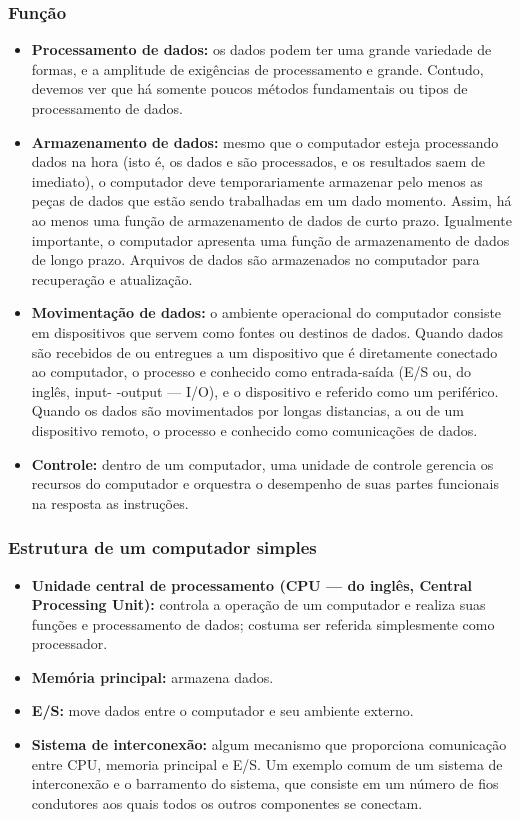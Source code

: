 \documentclass{article}
\begin{document}
\subsubsection{Função}
\begin{itemize}
    \item \textbf{Processamento de dados:} os dados podem ter uma grande
        variedade de formas, e a amplitude de exigências de processamento e
        grande. Contudo, devemos ver que há somente poucos métodos fundamentais
        ou tipos de processamento de dados.
    \item \textbf{Armazenamento de dados:} mesmo que o computador esteja
        processando dados na hora (isto é, os dados e são processados, e os
        resultados saem de imediato), o computador deve temporariamente
        armazenar pelo menos as peças de dados que estão sendo trabalhadas em
        um dado momento. Assim, há ao menos uma função de armazenamento de
        dados de curto prazo. Igualmente importante, o computador apresenta uma
        função de armazenamento de dados de longo prazo. Arquivos de dados são
        armazenados no computador para recuperação e atualização.
    \item \textbf{Movimentação de dados:} o ambiente operacional do computador
        consiste em dispositivos que servem como fontes ou destinos de dados.
        Quando dados são recebidos de ou entregues a um dispositivo que é
        diretamente conectado ao computador, o processo e conhecido como
        entrada-saída (E/S ou, do inglês, input- -output — I/O), e o
        dispositivo e referido como um periférico. Quando os dados são
        movimentados por longas distancias, a ou de um dispositivo remoto, o
        processo e conhecido como comunicações de dados.
    \item \textbf{Controle:} dentro de um computador, uma unidade de controle
        gerencia os recursos do computador e orquestra o desempenho de suas
        partes funcionais na resposta as instruções.
\end{itemize}

\subsubsection{Estrutura de um computador simples}
\begin{itemize}
    \item \textbf{Unidade central de processamento (CPU — do inglês, Central
        Processing Unit):} controla a operação de um computador e realiza suas
        funções e processamento de dados; costuma ser referida simplesmente
        como processador.
    \item \textbf{Memória principal:} armazena dados.
    \item \textbf{E/S:} move dados entre o computador e seu ambiente externo.
    \item \textbf{Sistema de interconexão:} algum mecanismo que proporciona
        comunicação entre CPU, memoria principal e E/S. Um exemplo comum de um
        sistema de interconexão e o barramento do sistema, que consiste em um
        número de fios condutores aos quais todos os outros componentes se
        conectam.
\end{itemize}
\end{document}
